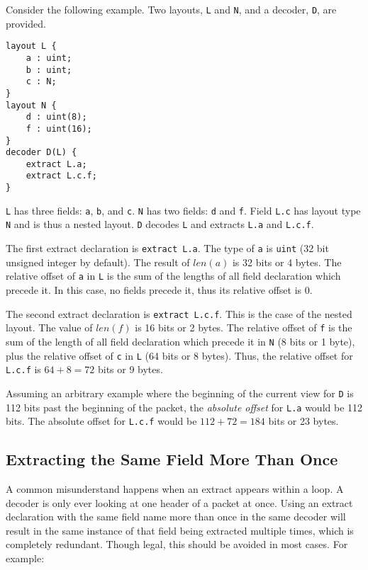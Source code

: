 Consider the following example. Two layouts, \texttt{L} and \texttt{N}, and a decoder, \texttt{D}, are provided.

\begin{minip}
\begin{lstlisting}
layout L {
	a : uint;
	b : uint;
	c : N;
}
layout N {
	d : uint(8);
	f : uint(16);
}
decoder D(L) {
	extract L.a;
	extract L.c.f;
}
\end{lstlisting}
\end{minip}

\texttt{L} has three fields: \texttt{a}, \texttt{b}, and \texttt{c}.  \texttt{N} has two fields: \texttt{d} and \texttt{f}. Field \texttt{L.c} has layout type \texttt{N} and is thus a nested layout. \texttt{D} decodes \texttt{L} and extracts \texttt{L.a} and \texttt{L.c.f}.

The first extract declaration is \texttt{extract L.a}. The type of \texttt{a} is \texttt{uint} (32 bit unsigned integer by default). The result of $len(a)$ is 32 bits or 4 bytes. The relative offset of \texttt{a} in \texttt{L} is the sum of the lengths of all field declaration which precede it. In this case, no fields precede it, thus its relative offset is 0.

The second extract declaration is \texttt{extract L.c.f}. This is the case of the nested layout. The value of $len(f)$ is 16 bits or 2 bytes. The relative offset of \texttt{f} is the sum of the length of all field declaration which precede it in \texttt{N} (8 bits or 1 byte), plus the relative offset of \texttt{c} in \texttt{L} (64 bits or 8 bytes). Thus, the relative offset for \texttt{L.c.f} is $64+8=72$ bits or 9 bytes.

Assuming an arbitrary example where the beginning of the current view for \texttt{D} is 112 bits past the beginning of the packet, the \textit{absolute offset} for \texttt{L.a} would be 112 bits. The absolute offset for \texttt{L.c.f} would be $112+72=184$ bits or 23 bytes.

\subsection{Extracting the Same Field More Than Once}

A common misunderstand happens when an extract appears within a loop.
A decoder is only ever looking at one header of a packet at once. Using an extract declaration with the same field name more than once in the same decoder will result in the same instance of that field being extracted multiple times, which is completely redundant. Though legal, this should be avoided in most cases. For example: 

